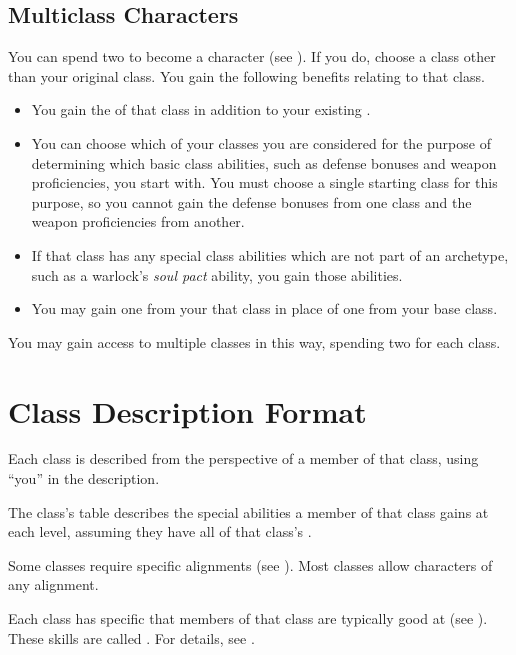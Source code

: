         \subsection{Multiclass Characters}\label{Multiclass Characters}
            You can spend two  to become a  character (see ).
            If you do, choose a class other than your original class.
            You gain the following benefits relating to that class.
            \begin{itemize}
                \item You gain the  of that class in addition to your existing .
                \item You can choose which of your classes you are considered for the purpose of determining which basic class abilities, such as defense bonuses and weapon proficiencies, you start with.
                    You must choose a single starting class for this purpose, so you cannot gain the defense bonuses from one class and the weapon proficiencies from another.
                \item If that class has any special class abilities which are not part of an archetype, such as a warlock's \textit{soul pact} ability, you gain those abilities.
                \item You may gain one  from your that class in place of one  from your base class.
            \end{itemize}

            You may gain access to multiple classes in this way, spending two  for each class.

\section{Class Description Format}
    Each class is described from the perspective of a member of that class, using ``you'' in the description.

    The class's table describes the special abilities a member of that class gains at each level, assuming they have all of that class's .

    Some classes require specific alignments (see ).
    Most classes allow characters of any alignment.

    Each class has specific  that members of that class are typically good at (see ).
    These skills are called .
    For details, see .

